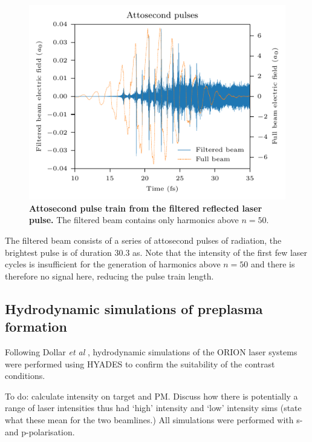 \begin{figure}
	\centering
	\includegraphics{figures/orion/orion_attosecond_pulse}
	\caption[Attosecond pulse train from the filtered reflected laser pulse.]{\textbf{Attosecond pulse train from the filtered reflected laser pulse.} The filtered beam contains only harmonics above $n = 50$.}
	\label{fig:orionattosecondpulse}
\end{figure}
The filtered beam consists of a series of attosecond pulses of radiation, the brightest pulse is of duration 30.3 as. Note that the intensity of the first few laser cycles is insufficient for the generation of harmonics above $n = 50$ and there is therefore no signal here, reducing the pulse train length.


\subsection{Hydrodynamic simulations of preplasma formation}
Following Dollar \textit{et al} \cite{dollarScalingHighorderHarmonic2013}, hydrodynamic simulations of the ORION laser systems were performed using HYADES to confirm the suitability of the contrast conditions.

To do: calculate intensity on target and PM. Discuss how there is potentially a range of laser intensities thus had `high' intensity and `low' intensity sims (state what these mean for the two beamlines.)
All simulations were performed with s- and p-polarisation.

